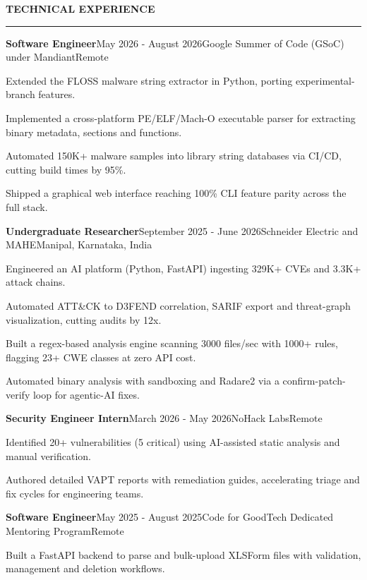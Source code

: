 \documentclass{resume}
\renewenvironment{rSection}[1]{%
  \par\vspace{0.12em}
  \noindent\BeginAccSupp{ActualText=#1}\MakeUppercase{\textbf{#1}}\EndAccSupp{}\par
  \vspace{0.15em}%
  \hrule
  \vspace{0em}%
}{%
  \par
}
\begin{document}
\vspace{-0.6em}
\begin{rSection}{Technical Experience}

\begin{rSubsection}{\bf Software Engineer}{May 2026 - August 2026}{Google Summer of Code (GSoC) under Mandiant}{Remote}
\item Extended the FLOSS malware string extractor in Python, porting experimental-branch features.
\item Implemented a cross-platform PE/ELF/Mach-O executable parser for extracting binary metadata, sections and functions.
\item Automated 150K+ malware samples into library string databases via CI/CD, cutting build times by 95\%.
\item Shipped a graphical web interface reaching 100\% CLI feature parity across the full stack.
\end{rSubsection}
\begin{rSubsection}{\bf Undergraduate Researcher}{September 2025 - June 2026}{Schneider Electric and MAHE}{Manipal, Karnataka, India}
\item Engineered an AI platform (Python, FastAPI) ingesting 329K+ CVEs and 3.3K+ attack chains.
\item Automated ATT\&CK to D3FEND correlation, SARIF export and threat-graph visualization, cutting audits by 12x.
\item Built a regex-based analysis engine scanning 3000 files/sec with 1000+ rules, flagging 23+ CWE classes at zero API cost.
\item Automated binary analysis with sandboxing and Radare2 via a confirm-patch-verify loop for agentic-AI fixes.
\end{rSubsection}
\begin{rSubsection}{\bf Security Engineer Intern}{March 2026 - May 2026}{NoHack Labs}{Remote}
\item Identified 20+ vulnerabilities (5 critical) using AI-assisted static analysis and manual verification.
\item Authored detailed VAPT reports with remediation guides, accelerating triage and fix cycles for engineering teams.
\end{rSubsection}
\begin{rSubsection}{\bf Software Engineer}{May 2025 - August 2025}{Code for GoodTech Dedicated Mentoring Program}{Remote}
\item Built a FastAPI backend to parse and bulk-upload XLSForm files with validation, management and deletion workflows.

\end{rSubsection}
\end{rSection}
\end{document}
